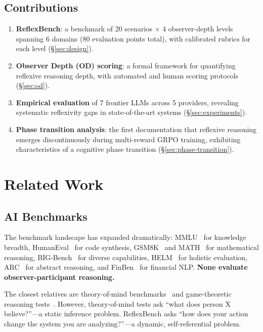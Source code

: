 \documentclass{article}
\begin{document}
\subsection{Contributions}

\begin{enumerate}[leftmargin=*]
\item \textbf{ReflexBench}: a benchmark of 20 scenarios $\times$ 4 observer-depth levels spanning 6 domains (80 evaluation points total), with calibrated rubrics for each level (\S\ref{sec:design}).
\item \textbf{Observer Depth (OD) scoring}: a formal framework for quantifying reflexive reasoning depth, with automated and human scoring protocols (\S\ref{sec:od}).
\item \textbf{Empirical evaluation} of 7 frontier LLMs across 5 providers, revealing systematic reflexivity gaps in state-of-the-art systems (\S\ref{sec:experiments}).
\item \textbf{Phase transition analysis}: the first documentation that reflexive reasoning emerges discontinuously during multi-reward GRPO training, exhibiting characteristics of a cognitive phase transition (\S\ref{sec:phase-transition}).
\end{enumerate}

\section{Related Work}
\label{sec:related}

\subsection{AI Benchmarks}
The benchmark landscape has expanded dramatically: MMLU~\citep{hendrycks2021} for knowledge breadth, HumanEval~\citep{chen2021} for code synthesis, GSM8K~\citep{cobbe2021} and MATH~\citep{hendrycks2021math} for mathematical reasoning, BIG-Bench~\citep{srivastava2023} for diverse capabilities, HELM~\citep{liang2023} for holistic evaluation, ARC~\citep{chollet2019} for abstract reasoning, and FinBen~\citep{xie2024} for financial NLP. \textbf{None evaluate observer-participant reasoning.}

The closest relatives are theory-of-mind benchmarks~\citep{sap2022,gandhi2024} and game-theoretic reasoning tests~\citep{akata2023}. However, theory-of-mind tests ask ``what does person X believe?''---a static inference problem. ReflexBench asks ``how does your action change the system you are analyzing?''---a dynamic, self-referential problem.
\end{document}

